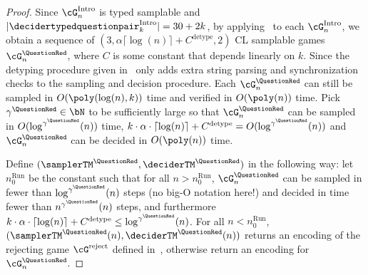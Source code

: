 \begin{proof}
	Since $\cG_{n}^{\text{Intro}}$ is typed samplable and $|\decidertypedquestionpair^{\text{Intro}}_k| = 30 + 2k$, by applying~ to each $\cG_n^{\text{Intro}}$, we obtain a sequence of $(3, \alpha \lceil\log(n) \rceil + C^{\text{detype}} ,2)$ CL samplable games $\cG^{\QuestionRed}_n$, where $C$ is some constant that depends linearly on $k$. Since the detyping procedure given in~ only adds extra string parsing and synchronization checks to the sampling and decision procedure. Each $\cG^{\QuestionRed}_n$ can still be sampled in $O(\poly(\log(n), k))$ time and verified in $O(\poly(n))$ time. Pick $\gamma^{\QuestionRed} \in \bN$ to be sufficiently large so that $\cG^{\QuestionRed}_n$ can be sampled in $O(\log^{\gamma^{\QuestionRed}}(n))$ time, $k \cdot \alpha \cdot \lceil\log(n) \rceil + C^{\text{detype}} = O(\log^{\gamma^{\QuestionRed}}(n))$ and $\cG^{\QuestionRed}_n$ can be decided in $O(\poly(n))$ time. 
	
	Define $(\samplerTM^{\QuestionRed}, \deciderTM^{\QuestionRed})$ in the following way: let $n_0^{\text{Run}}$ be the constant such that for all $n > n_0^{\text{Run}}$, $\cG^{\QuestionRed}_n$ can be sampled in fewer than $\log^{\gamma^{\QuestionRed}}(n)$ steps (no big-O notation here!) and decided in time fewer than $n^{\gamma^{\QuestionRed}}(n)$ steps, and furthermore $k \cdot \alpha \cdot \lceil\log(n) \rceil + C^{\text{detype}} \leq \log^{\gamma^{\QuestionRed}}(n)$. For all $n < n_0^{\text{Run}}$, $(\samplerTM^{\QuestionRed}(n), \deciderTM^{\QuestionRed}(n))$ returns an encoding of the rejecting game $\cG^{\text{reject}}$ defined in~, otherwise return an encoding for $\cG^{\QuestionRed}_n$. 
	

\end{proof}
